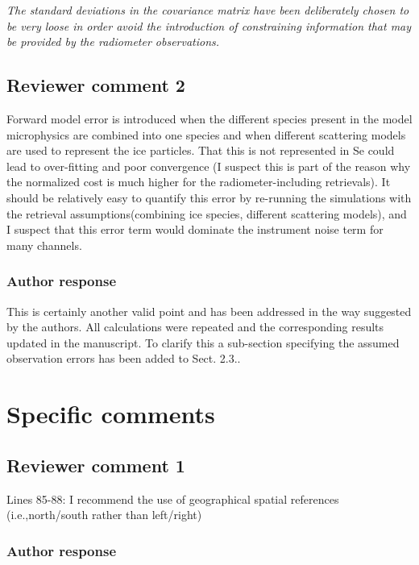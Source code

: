 \documentclass[11pt]{scrartcl}
\begin{document}
\vspace{1em}

\textit{The standard deviations in the covariance matrix have been deliberately
  chosen to be very loose in order avoid the introduction of constraining
  information that may be provided by the radiometer observations.}

\subsection*{Reviewer comment 2}

Forward model error is introduced when the different species present in the
model microphysics are combined into one species and when different scattering
models are used to represent the ice particles. That this is not represented in
Se could lead to over-fitting and poor convergence (I suspect this is part of
the reason why the normalized cost is much higher for the radiometer-including
retrievals). It should be relatively easy to quantify this error by re-running
the simulations with the retrieval assumptions(combining ice species, different
scattering models), and I suspect that this error term would dominate the
instrument noise term for many channels.

\subsubsection*{Author response}

This is certainly another valid point and has been addressed in the way suggested
by the authors. All calculations were repeated and the corresponding results
updated in the manuscript. To clarify this a sub-section specifying the assumed observation
errors has been added to Sect. 2.3..
\vspace{1em}


\section{Specific comments}

\subsection*{Reviewer comment 1}
Lines  85-88:   I  recommend  the  use  of  geographical  spatial  references  (i.e.,north/south rather than left/right)

\subsubsection*{Author response}
\end{document}
